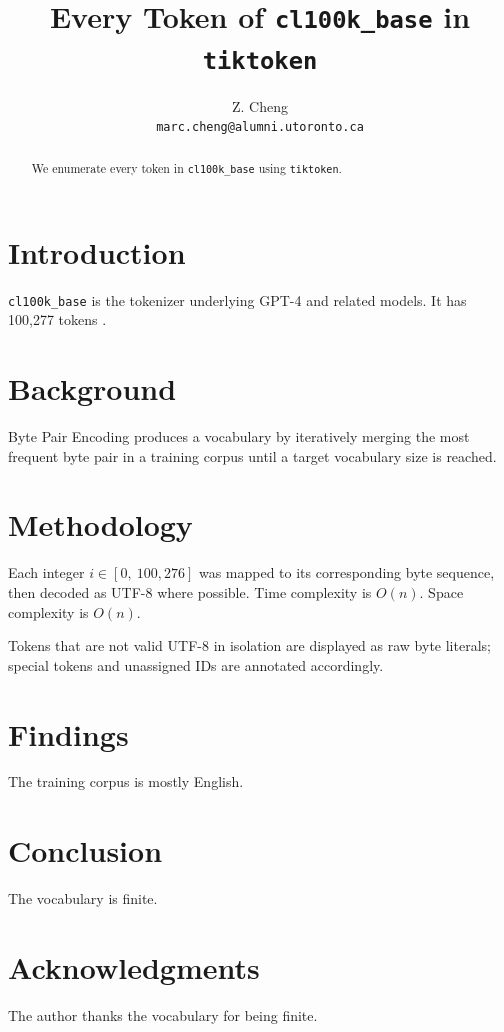 \documentclass{article}
\title{Every Token of \texttt{cl100k\_base} in \texttt{tiktoken}}
\author{
  Z. Cheng \\
  \texttt{marc.cheng@alumni.utoronto.ca}
}
\begin{document}
\maketitle
\thispagestyle{plain}

\begin{abstract}
\begin{center}
We enumerate every token in \texttt{cl100k\_base} using \texttt{tiktoken}.
\end{center}
\end{abstract}

\section{Introduction}
\texttt{cl100k\_base} is the tokenizer underlying GPT-4 \cite{openai2023gpt4}
and related models.
It has 100,277 tokens \cite{tiktoken}.

\section{Background}
Byte Pair Encoding \cite{sennrich2016neural} produces a vocabulary
by iteratively merging the most frequent byte pair in a training corpus
until a target vocabulary size is reached.

\section{Methodology}
Each integer $i \in [0,\ 100{,}276]$ was mapped to its corresponding byte sequence, then decoded as UTF-8 where possible. Time complexity is $O(n)$. Space complexity is $O(n)$.

Tokens that are not valid UTF-8 in isolation are displayed as raw byte
literals; special tokens and unassigned IDs are annotated accordingly.

\section{Findings}
The training corpus is mostly English.

\section{Conclusion}
The vocabulary is finite.

\section*{Acknowledgments}
The author thanks the vocabulary for being finite.
\end{document}
